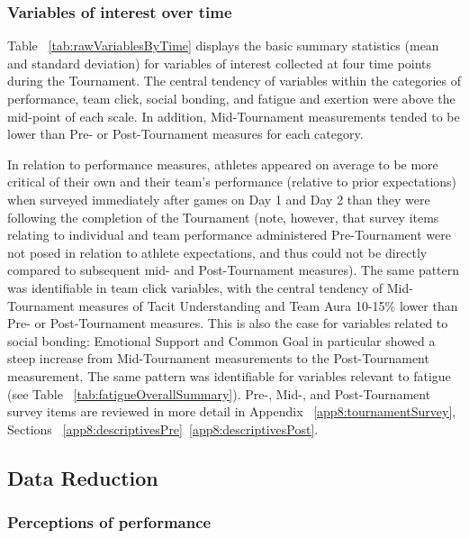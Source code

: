 \begin{CJK}{UTF8}{gbsn}
\subsubsection{Variables of interest over time}
Table ~\ref{tab:rawVariablesByTime} displays the basic summary statistics (mean and standard deviation) for variables of interest collected at four time points during the Tournament.  The central tendency of variables within the categories of performance, team click, social bonding, and fatigue and exertion were above the mid-point of each scale.  In addition, Mid-Tournament measurements tended to be lower than Pre- or Post-Tournament measures for each category.



In relation to performance measures, athletes appeared on average to be more critical of their own and their team’s performance (relative to prior expectations) when surveyed immediately after games on Day 1 and Day 2 than they were following the completion of the Tournament (note, however, that survey items relating to individual and team performance administered Pre-Tournament were not posed in relation to athlete expectations, and thus could not be directly compared to subsequent mid- and Post-Tournament measures).  The same pattern was identifiable in team click variables, with the central tendency of Mid-Tournament measures of Tacit Understanding and Team Aura 10-15\% lower than Pre- or Post-Tournament measures.  This is also the case for variables related to social bonding: Emotional Support and Common Goal in particular showed a steep increase from Mid-Tournament measurements to the Post-Tournament measurement.  The same pattern was identifiable for variables relevant to fatigue (see Table ~\ref{tab:fatigueOverallSummary}).
Pre-, Mid-, and Post-Tournament survey items are reviewed in more detail in Appendix ~\ref{app8:tournamentSurvey}, Sections ~\ref{app8:descriptivesPre}\nobreakdash~\ref{app8:descriptivesPost}.







\subsection{Data Reduction\label{Ch5:dataReduction}}


\subsubsection{Perceptions of performance}


\end{CJK}
